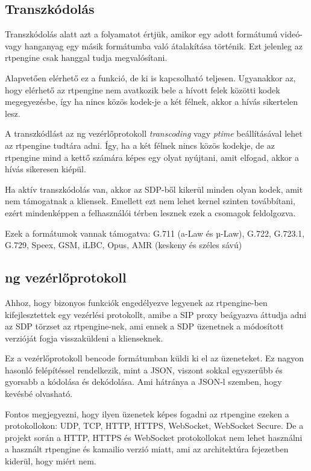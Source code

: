 \subsection{Transzkódolás}

Transzkódolás alatt azt a folyamatot értjük, amikor egy adott formátumú videó- vagy 
hanganyag egy másik formátumba való átalakítása történik. Ezt jelenleg az rtpengine 
csak hanggal tudja megvalósítani. 

Alapvetően elérhető ez a funkció, de ki is kapcsolható teljesen. Ugyanakkor az, hogy 
elérhető az rtpengine nem avatkozik bele a hívott felek közötti kodek megegyezésbe, 
így ha nincs közös kodek-je a két félnek, akkor a hívás sikertelen lesz.

A transzkódlást az ng vezérlőprotokoll \textit{transcoding} vagy \textit{ptime} beállításával
lehet az rtpengine tudtára adni. Így, ha a két félnek nincs közös kodekje, de az rtpengine
mind a kettő számára képes egy olyat nyújtani, amit elfogad, akkor a hívás sikeresen kiépül.

Ha aktív transzkódolás van, akkor az SDP-ből kikerül minden olyan kodek, amit nem támogatnak
a kliensek. Emellett ezt nem lehet kernel szinten továbbítani, ezért mindenképpen a 
felhasználói térben lesznek ezek a csomagok feldolgozva.

Ezek a formátumok vannak támogatva: G.711 (a-Law és µ-Law), G.722, G.723.1, G.729, Speex, 
GSM, iLBC, Opus, AMR (keskeny és széles sávú)

\subsection{ng vezérlőprotokoll}

Ahhoz, hogy bizonyos funkciók engedélyezve legyenek az rtpengine-ben kifejlesztettek 
egy vezérlési protokollt, amibe a SIP proxy beágyazva áttudja adni az SDP törzset 
az rtpengine-nek, ami ennek a SDP üzenetnek a módosított verzióját fogja visszaküldeni
a klienseknek.

Ez a vezérlőprotokoll bencode formátumban küldi ki el az üzeneteket. Ez nagyon hasonló
felépítéssel rendelkezik, mint a JSON, viszont sokkal egyszerűbb és gyorsabb a kódolása 
és dekódolása. Ami hátránya a JSON-l szemben, hogy kevésbé olvasható.

Fontos megjegyezni, hogy ilyen üzenetek képes fogadni az rtpengine ezeken a protokollokon: 
UDP, TCP, HTTP, HTTPS, WebSocket, WebSocket Secure. De a projekt során a HTTP, HTTPS és 
WebSocket protokollokat nem lehet használni a használt rtpengine és kamailio 
verzió miatt, ami az architektúra fejezetben kiderül, hogy miért nem.

